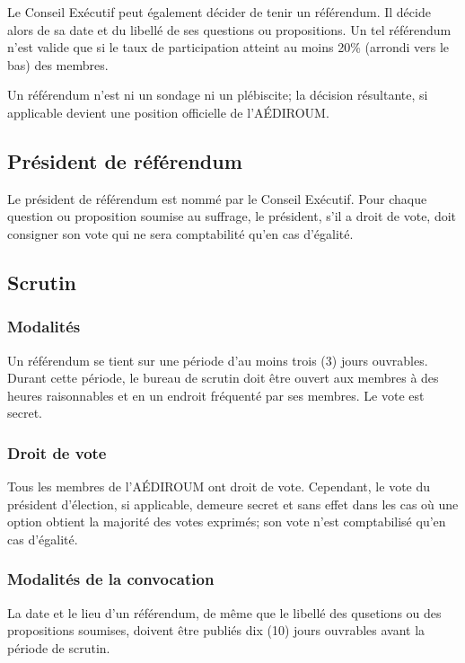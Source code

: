 \documentclass{aediroum}
\begin{document}
Le Conseil Exécutif peut également décider de tenir un référendum. Il décide alors de sa date et du libellé de ses questions ou propositions. Un tel référendum n'est valide que si le taux de participation atteint au moins 20\% (arrondi vers le bas) des membres.

Un référendum n'est ni un sondage ni un plébiscite; la décision résultante, si applicable devient une position officielle de l'AÉDIROUM.

\subsection{Président de référendum}\label{sec:president-de-referendum}
Le président de référendum est nommé par le Conseil Exécutif. Pour chaque question ou proposition soumise au suffrage, le président, s'il a droit de vote, doit consigner son vote qui ne sera comptabilité qu'en cas d'égalité.

\subsection{Scrutin}\label{sec:scrutin}
\subsubsection{Modalités}\label{sec:modalites-scrutin}

Un référendum se tient sur une période d'au moins trois (3) jours ouvrables. Durant cette période, le bureau de scrutin doit être ouvert aux membres à des heures raisonnables et en un endroit fréquenté par ses membres. Le vote est secret.

\subsubsection{Droit de vote}\label{sec:droit-de-vote}

Tous les membres de l'AÉDIROUM ont droit de vote. Cependant, le vote du président d'élection, si applicable, demeure secret et sans effet dans les cas où une option obtient la majorité des votes exprimés; son vote n'est comptabilisé qu'en cas d'égalité.

\subsubsection{Modalités de la convocation}\label{sec:modalites-convocation}

La date et le lieu d'un référendum, de même que le libellé des qusetions ou des propositions soumises, doivent être publiés dix (10) jours ouvrables avant la période de scrutin.
\end{document}
